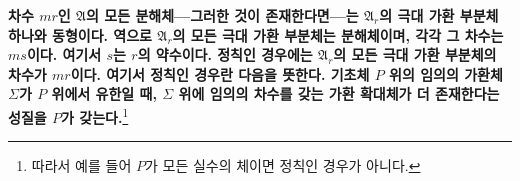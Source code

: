 \documentclass[11pt]{article}
\providecommand{\mA}{\mathfrak{A}}
\providecommand{\srcspaced}[1]{\textbf{#1}}
\begin{document}
\srcspaced{차수 $mr$인 $\mA$의 모든 분해체---그러한 것이 존재한다면---는 $\mA_r$의 극대 가환 부분체 하나와 동형이다. 역으로 $\mA_r$의 모든 극대 가환 부분체는 분해체이며, 각각 그 차수는 $ms$이다. 여기서 $s$는 $r$의 약수이다. 정칙인 경우에는 $\mA_r$의 모든 극대 가환 부분체의 차수가 $mr$이다. 여기서 정칙인 경우란 다음을 뜻한다. 기초체 $P$ 위의 임의의 가환체 $\Sigma$가 $P$ 위에서 유한일 때, $\Sigma$ 위에 임의의 차수를 갖는 가환 확대체가 더 존재한다는 성질을 $P$가 갖는다.}\footnote{따라서 예를 들어 $P$가 모든 실수의 체이면 정칙인 경우가 아니다.}
\end{document}
